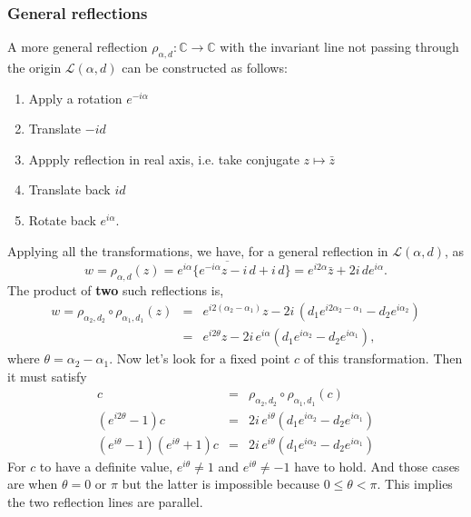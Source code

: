 \documentclass{article}
\begin{document}
\subsubsection{General reflections}
\label{sec-3-1-2}
A more general reflection $\rho_{\alpha,d}:\mathbb{C} \rightarrow \mathbb{C}$ with the invariant line not passing through the origin $\mathcal{L}(\alpha, d)$ can be constructed as follows:
\begin{enumerate}
\item Apply a rotation $e^{-i\alpha}$
\item Translate $-id$
\item Appply reflection in real axis, i.e. take conjugate $z \mapsto \bar{z}$
\item Translate back $id$
\item Rotate back $e^{i\alpha}$.
\end{enumerate}
Applying all the transformations, we have, for a general reflection in $\mathcal{L}(\alpha, d)$, as
\begin{equation}
w = \rho_{\alpha,d} (z) = e^{i\alpha}\{ \overline{e^{-i\alpha} z - i\,d} + i\,d \} = e^{i2\alpha} \bar{z} + 2i \, de^{i\alpha}.
\end{equation}
The product of \textbf{two} such reflections is,
\begin{eqnarray}
w = \rho_{\alpha_{2}, d_{2}} \circ \rho_{\alpha_{1},d_{1}} (z) &=& e^{i2(\alpha_{2} - \alpha_{1})} z - 2i \, ( d_{1} e^{i2\alpha_{2} - \alpha_{1}} - d_{2} e^{i\alpha_{2}})  \nonumber \\
&=& e^{i2\theta} z - 2i \, e^{i\alpha}( d_{1} e^{i\alpha_{2}} - d_{2} e^{i\alpha_{1}}),
\end{eqnarray}
where $\theta = \alpha_{2} - \alpha_{1}$. Now let's look for a fixed point $c$ of this transformation. Then it must satisfy
\begin{eqnarray}
c &=&  \rho_{\alpha_{2}, d_{2}} \circ \rho_{\alpha_{1},d_{1}} (c) \nonumber \\
(e^{i2\theta} - 1)c &=&  2i \, e^{i\theta}( d_{1} e^{i\alpha_{2}} - d_{2} e^{i\alpha_{1}}) \nonumber  \\
(e^{i\theta} - 1)(e^{i\theta} + 1)c &=&  2i \, e^{i\theta}( d_{1} e^{i\alpha_{2}} - d_{2} e^{i\alpha_{1}}) \nonumber 
\end{eqnarray}
For $c$ to have a definite value, $e^{i\theta} \ne 1$ and $e^{i\theta} \ne -1$ have to hold. And those cases are when $\theta = 0$ or $\pi$ but the latter is impossible because $0 \le \theta < \pi$. 
This implies the two reflection lines are parallel.\\
\end{document}
